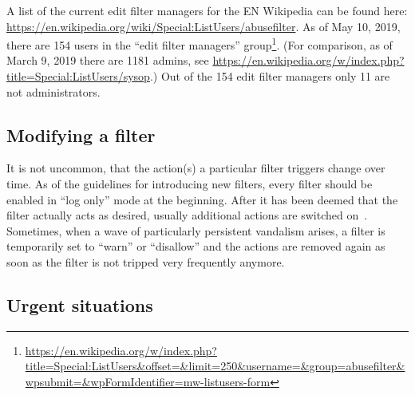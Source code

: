 A list of the current edit filter managers for the EN Wikipedia can be found here: \url{https://en.wikipedia.org/wiki/Special:ListUsers/abusefilter}.
As of May 10, 2019, there are 154 users in the ``edit filter managers'' group\footnote{\url{https://en.wikipedia.org/w/index.php?title=Special:ListUsers&offset=&limit=250&username=&group=abusefilter&wpsubmit=&wpFormIdentifier=mw-listusers-form}}.
(For comparison, as of March 9, 2019 there are 1181 admins, see \url{https://en.wikipedia.org/w/index.php?title=Special:ListUsers/sysop}.)
Out of the 154 edit filter managers only 11 are not administrators.

\subsection{Modifying a filter}
It is not uncommon, that the action(s) a particular filter triggers change over time.
As of the guidelines for introducing new filters, every filter should be enabled in ``log only'' mode at the beginning.
After it has been deemed that the filter actually acts as desired, usually additional actions are switched on~\cite{Wikipedia:EditFilterInstructions}.
Sometimes, when a wave of particularly persistent vandalism arises, a filter is temporarily set to ``warn'' or ``disallow'' and the actions are removed again as soon as the filter is not tripped very frequently anymore. %

\subsection{Urgent situations}

